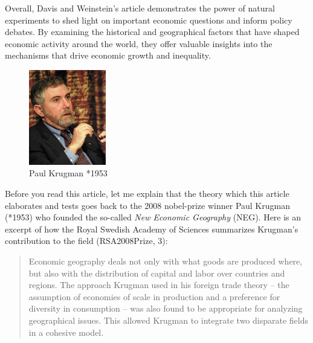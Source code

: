 \documentclass[
  12pt,
  oneside]{book}
\theoremstyle{definition}
\theoremstyle{definition}
\theoremstyle{definition}
\theoremstyle{definition}
\theoremstyle{remark}
\begin{document}
Overall, Davis and Weinstein's article demonstrates the power of natural experiments to shed light on important economic questions and inform policy debates. By examining the historical and geographical factors that have shaped economic activity around the world, they offer valuable insights into the mechanisms that drive economic growth and inequality.

\begin{figure}
\centering
\includegraphics[width=0.3\textwidth,height=\textheight]{fig/krugman.jpeg}
\caption[\label{fig:krugman} Paul Krugman *1953]{\label{fig:krugman} Paul Krugman *1953\footnotemark{}}
\end{figure}

Before you read this article, let me explain that the theory which this article elaborates and tests goes back to the 2008 nobel-prize winner Paul Krugman (*1953) who founded the so-called \emph{New Economic Geography} (NEG).
Here is an excerpt of how the Royal Swedish Academy of Sciences summarizes Krugman's contribution to the field (RSA2008Prize, 3):

\begin{quote}
Economic geography deals not only with what goods are produced where, but also with the distribution of capital and labor over countries and regions. The approach Krugman used in his foreign trade theory -- the assumption of economies of scale in production and a preference for diversity in consumption -- was also found to be appropriate for analyzing geographical issues. This allowed Krugman to integrate two disparate fields in a cohesive model.
\end{quote}
\end{document}
